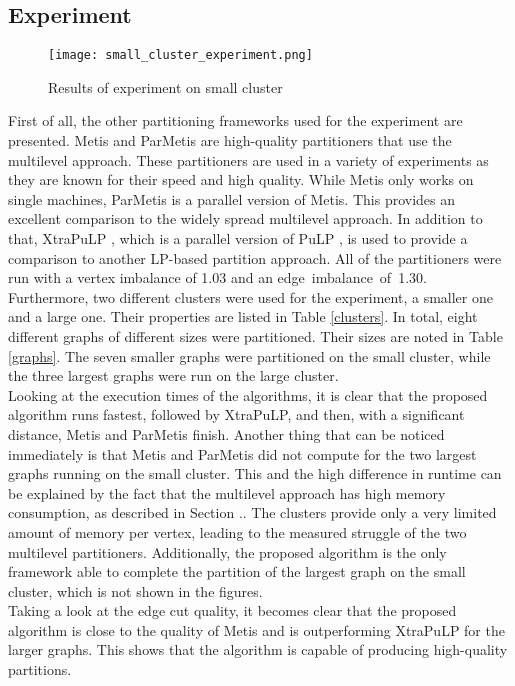 \documentclass[acmsmall,nonacm,screen,review]{acmart}
\begin{document}
\subsection{Experiment}
\begin{figure}[bt!]
\centering
\caption{Results of experiment on small cluster}
\label{small_ex}
\texttt{[image: small\_cluster\_experiment.png]}
\end{figure}
First of all, the other partitioning frameworks used for the experiment are presented. Metis \cite{Metis} and ParMetis \cite{ParMetis} are high-quality partitioners that use the multilevel approach. These partitioners are used in a variety of experiments as they are known for their speed and high quality. While Metis only works on single machines, ParMetis is a parallel version of Metis. This provides an excellent comparison to the widely spread multilevel approach. In addition to that, XtraPuLP \cite{XtraPuLP}, which is a parallel version of PuLP \cite{PuLP}, is used to provide a comparison to another LP-based partition approach. All of the partitioners were run with a vertex imbalance of 1.03 and an \hbox{edge imbalance of 1.30.} \\
Furthermore, two different clusters were used for the experiment, a smaller one and a large one. Their properties are listed in Table \ref{clusters}. In total, eight different graphs of different sizes were partitioned. Their sizes are noted in Table \ref{graphs}. The seven smaller graphs were partitioned on the small cluster, while the three largest graphs were run on the large cluster. \\
Looking at the execution times of the algorithms, it is clear that the proposed algorithm runs fastest, followed by XtraPuLP, and then, with a significant distance, Metis and ParMetis finish. Another thing that can be noticed immediately is that Metis and ParMetis did not compute for the two largest graphs running on the small cluster. This and the high difference in runtime can be explained by the fact that the multilevel approach has high memory consumption, as described in Section .. The clusters provide only a very limited amount of memory per vertex, leading to the measured struggle of the two multilevel partitioners. Additionally, the proposed algorithm is the only framework able to complete the partition of the largest graph on the small cluster, which is not shown in the figures. \\
Taking a look at the edge cut quality, it becomes clear that the proposed algorithm is close to the quality of Metis and is outperforming XtraPuLP for the larger graphs. This shows that the algorithm is capable of producing high-quality partitions. \\
\end{document}
